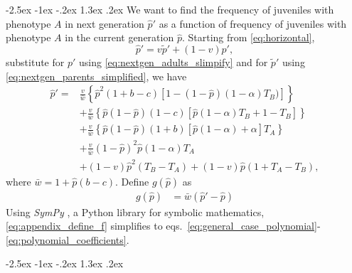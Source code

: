 \documentclass[12pt]{extarticle}
\makeatletter
\renewcommand\section{\@startsection {section}{1}{\z@}%
     {-2.5ex \@plus -1ex \@minus -.2ex}%
     {1.3ex \@plus.2ex}%
    {\Large\bfseries}}
\makeatother
\begin{document}
{%
\begin{appendices}
\renewcommand{\theequation}{\thesection\arabic{equation}}

\section{} \label{sec:appendixA}
We want to find the frequency of juveniles with phenotype $A$ in next generation $\hat{p}'$ as a function of frequency
of juveniles with phenotype $A$ in the current generation $\hat{p}$.
Starting from \autoref{eq:horizontal},
\begin{equation}\label{eq:appendix_b_1}
  \hat{p}' = v \tilde{p}' + (1-v) p',
\end{equation}
 substitute for $p'$ using \autoref{eq:nextgen_adults_slimpify} and for $\tilde{p}'$ using \autoref{eq:nextgen_parents_simplified}, we have
\begin{equation}\label{eq:appendix_b_2}
  \begin{aligned}
  \hat{p}'  = & \frac{v}{\bar{w}}\left\{\hat{p}^2(1+b-c)\left[1-(1-\hat{p})(1-\alpha)T_B)\right]\right\} \\
  & + \frac{v}{\bar{w}}\left\{ \hat{p}(1-\hat{p})(1-c)\left[ \hat{p}(1-\alpha)T_B + 1 - T_B \right] \right\} \\
  & + \frac{v}{\bar{w}}\left\{ \hat{p}(1-\hat{p})(1+b)\left[\hat{p}(1-\alpha) + \alpha \right]T_A \right\} \\
  & + \frac{v}{\bar{w}}(1-\hat{p})^2\hat{p}(1-\alpha)T_A \\
  & + (1-v)\hat{p}^2(T_B-T_A) + (1-v)\hat{p}(1+T_A-T_B),
\end{aligned}
\end{equation}
where $\bar{w} = 1 + \hat{p}(b-c)$. 
Define $g(\hat{p})$ as
\begin{equation} \label{eq:appendix_define_f}
\begin{aligned}
      g(\hat{p}) &= \bar{w}(\hat{p}' - \hat{p})
\end{aligned}
\end{equation}
Using \emph{SymPy} \citep{Meurer2017}, a Python library for symbolic mathematics,  \autoref{eq:appendix_define_f} simplifies to 
eqs.~\ref{eq:general_case_polynomial}-\ref{eq:polynomial_coefficients}.

\section{} \label{sec:appendixB}


\end{appendices}}
\end{document}
